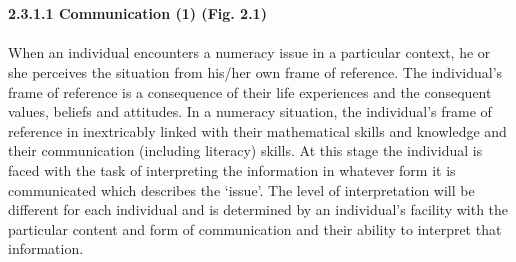 \documentclass{article}
\begin{document}
\textit{\\\\}
\textbf{ 2.3.1.1 Communication (1) (Fig. 2.1) }
\textit{\\\\}
 When an individual encounters a numeracy issue in a particular context, he or
 she perceives the situation from his/her own frame of reference. The individual’s
 frame of reference is a consequence of their life experiences and the consequent
 values, beliefs and attitudes. In a numeracy situation, the individual’s frame of
 reference in inextricably linked with their mathematical skills and knowledge and
 their communication (including literacy) skills. At this stage the individual is faced
 with the task of interpreting the information in whatever form it is communicated
 which describes the ‘issue’. The level of interpretation will be different for each
 individual and is determined by an individual’s facility with the particular content
 and form of communication and their ability to interpret that information.
\textit{\\\\}
\end{document}
